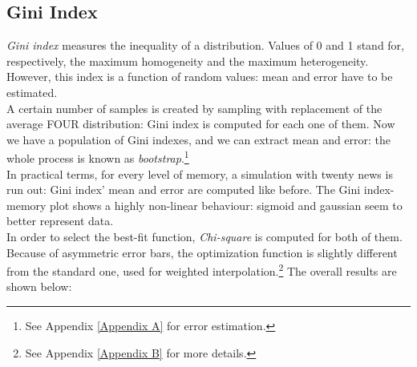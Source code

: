 \subsection{Gini Index}
\textit{Gini index}\cite{ginindex} measures the inequality of a
distribution. Values of 0 and 1 stand for, respectively, the
maximum homogeneity and the maximum heterogeneity.
However, this index is a function of random values: mean and
error have to be estimated.\\
A certain number of samples is created by sampling with replacement
of the average FOUR distribution: Gini index is computed for each
one of them.
Now we have a population of Gini indexes, and we can extract
mean and error: the whole process is known as
\textit{bootstrap}.\footnote{See Appendix \ref{Appendix A} for error estimation.}\cite{bootstrap}\\
In practical terms, for every level of  memory, a simulation with
twenty news is run out: Gini index' mean and error are computed
like before.
The Gini index-memory plot shows a highly non-linear behaviour:
sigmoid and gaussian seem to better represent data.\\
In order to select the best-fit function, \textit{Chi-square} is
computed for both of them. \\
Because of asymmetric error bars, the optimization function is
slightly different from the standard one, used for weighted
interpolation.\footnote{See Appendix \ref{Appendix B} for more details.}
The overall results are shown below:

